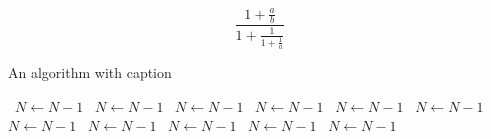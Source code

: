 \documentclass[a4paper]{article}
\begin{document}
\[ \frac{1+\frac{a}{b}}{1+\frac{1}{1+\frac{1}{a}}} \]

\begin{algorithm}
\caption{An algorithm with caption}
\begin{algorithmic}
\    \State $N \gets N - 1$
\    \State $N \gets N - 1$
\    \State $N \gets N - 1$
\    \State $N \gets N - 1$
\    \State $N \gets N - 1$
\    \State $N \gets N - 1$
\    \State $N \gets N - 1$
\    \State $N \gets N - 1$
\    \State $N \gets N - 1$
\    \State $N \gets N - 1$
\    \State $N \gets N - 1$
\EndWhile
\end{algorithmic}
\end{algorithm}
\end{document}
